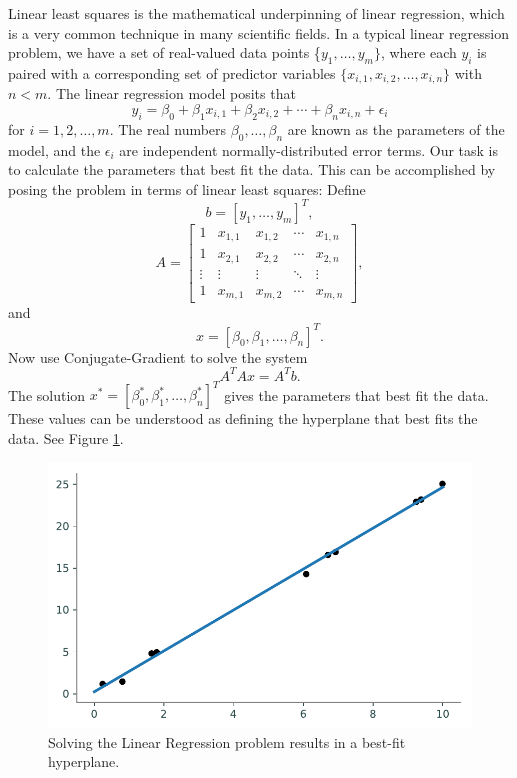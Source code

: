 Linear least squares is the mathematical underpinning of linear regression, which is a very common technique in many scientific fields.
In a typical linear regression problem, we have a set of real-valued data points \{$y_1,\ldots, y_m\}$, where each
$y_i$ is paired with a corresponding set of predictor variables $\{x_{i,1}, x_{i,2}, \ldots, x_{i,n}\}$ with $n < m$.
The linear regression model posits that
\[
y_i = \beta_0 + \beta_1x_{i,1} + \beta_2x_{i,2} + \cdots + \beta_nx_{i,n} + \epsilon_i
\]
for $i = 1, 2, \ldots, m$. The real numbers $\beta_0,\ldots,\beta_n$ are known as the parameters of the model, and the
$\epsilon_i$ are independent normally-distributed error terms. Our task is to calculate the parameters that best fit the data.
This can be accomplished by posing the problem in terms of linear least squares: Define
\[
b = [y_1, \ldots, y_m]^T,
\]
\[
A =
\begin{bmatrix}
1 & x_{1,1} & x_{1,2} & \cdots & x_{1,n}\\
1 & x_{2,1} & x_{2,2} & \cdots & x_{2,n}\\
\vdots & \vdots & \vdots & \ddots & \vdots\\
1 & x_{m,1} & x_{m,2} & \cdots & x_{m,n}
\end{bmatrix},
\]
and
\[
x = [\beta_0, \beta_1,\ldots, \beta_n]^T.
\]
Now use Conjugate-Gradient to solve the system
\[
A^TAx = A^Tb.
\]
The solution $x^* = [\beta_0^*, \beta_1^*, \ldots, \beta_n^*]^T$ gives the parameters that best fit the data.
These values can be understood as defining the hyperplane that best fits the data. See Figure \ref{fig:linregression}.

\begin{figure}
\centering
\includegraphics[width=\textwidth]{figures/linregression.pdf}
\caption{Solving the Linear Regression problem results in a best-fit hyperplane.}
\label{fig:linregression}
\end{figure}

